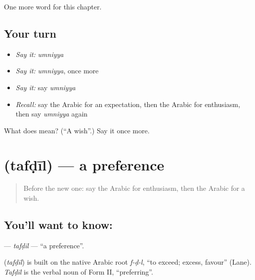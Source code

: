 \begin{grammarlens}[title={What you've built}]
One more word for this chapter.
\end{grammarlens}

\subsection*{Your turn}
\begin{itemize}
\raggedright
  \item \emph{Say it:} \emph{umniyya}
  \item \emph{Say it:} \emph{umniyya}, once more
  \item \emph{Say it:} say \emph{umniyya}
  \item \emph{Recall:} say the Arabic for an expectation, then the Arabic for enthusiasm, then say \emph{umniyya} again
\end{itemize}

\begin{tcolorbox}[breakable,colback=teal!4,colframe=teal!35!black,title={Before you move on}]
What does  mean? (\textquotedblleft{}A wish\textquotedblright{}.) Say it once more.
\end{tcolorbox}
\section[\texorpdfstring{\ar{تفضيل} (tafḍīl)}{تفضيل (tafḍīl)}]{ (tafḍīl) — a preference}

\label{lesson:AR-C111-tafdil}



\begin{quote}
Before the new one: say the Arabic for enthusiasm, then the Arabic for a wish.
\end{quote}

\subsection*{You'll want to know: }
\textbf{} — \emph{tafḍīl} — \textquotedblleft{}a preference\textquotedblright{}.

\begin{cousinweb}
\textbf{} (\emph{tafḍīl}) is built on the native Arabic root \emph{f-ḍ-l}, \textquotedblleft{}to exceed; excess, favour\textquotedblright{} (Lane). \emph{Tafḍīl} is the verbal noun of Form II, \textquotedblleft{}preferring\textquotedblright{}.
\end{cousinweb}

